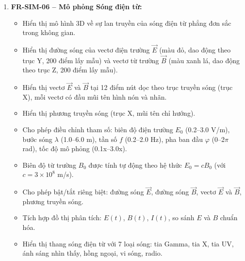 \begin{enumerate}
    \item \textbf{FR-SIM-06 – Mô phỏng Sóng điện từ:}
    \begin{itemize}
        \item Hiển thị mô hình 3D về sự lan truyền của sóng điện từ phẳng đơn sắc trong không gian.
        \item Hiển thị đường sóng của vectơ điện trường $\vec{E}$ (màu đỏ, dao động theo trục Y, 200 điểm lấy mẫu) và vectơ từ trường $\vec{B}$ (màu xanh lá, dao động theo trục Z, 200 điểm lấy mẫu).
        \item Hiển thị vectơ $\vec{E}$ và $\vec{B}$ tại 12 điểm nút dọc theo trục truyền sóng (trục X), mỗi vectơ có đầu mũi tên hình nón và nhãn.
        \item Hiển thị phương truyền sóng (trục X, mũi tên chỉ hướng).
        \item Cho phép điều chỉnh tham số: biên độ điện trường $E_0$ (0.2–3.0 V/m), bước sóng $\lambda$ (1.0–6.0 m), tần số $f$ (0.2–2.0 Hz), pha ban đầu $\varphi$ (0–2$\pi$ rad), tốc độ mô phỏng (0.1x–3.0x).
        \item Biên độ từ trường $B_0$ được tính tự động theo hệ thức $E_0 = cB_0$ (với $c = 3 \times 10^8$ m/s).
        \item Cho phép bật/tắt riêng biệt: đường sóng $\vec{E}$, đường sóng $\vec{B}$, vectơ $\vec{E}$ và $\vec{B}$, phương truyền sóng.
        \item Tích hợp đồ thị phân tích: $E(t)$, $B(t)$, $I(t)$, so sánh $E$ và $B$ chuẩn hóa.
        \item Hiển thị thang sóng điện từ với 7 loại sóng: tia Gamma, tia X, tia UV, ánh sáng nhìn thấy, hồng ngoại, vi sóng, radio.
    \end{itemize}
    

\end{enumerate}
